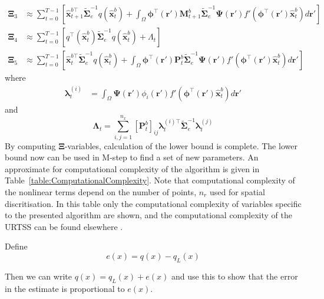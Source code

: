 \documentclass[]{article}
\begin{document}
\begin{align}
\boldsymbol\Xi_{3}&\approx\sum_{t=0}^{T-1}\left[ \mathbf{\hat x}_{t+1}^{b\top}\tilde{\boldsymbol\Sigma}_e^{-1}q(\mathbf{\hat x}_t^b)+\int_\Omega\boldsymbol \phi^\top(\mathbf r') \mathbf M_{t+1}^b \tilde{\boldsymbol\Sigma}_e^{-1} \boldsymbol{\Psi}(\mathbf{r}') f'(\boldsymbol \phi^\top(\mathbf r')\mathbf {\hat x}_t^b) d\mathbf{r}'\right] \\	
\boldsymbol\Xi_{4}&\approx\sum_{t=0}^{T-1}\left[q^\top(\mathbf{\hat x}_t^b)\tilde{\boldsymbol\Sigma}_e^{-1}q(\mathbf{\hat x}_t^b)+\Lambda_t\right] \\
 \boldsymbol\Xi_{5}&\approx\sum_{t=0}^{T-1}\left[ \mathbf{\hat x}_{t}^{b\top}\tilde{\boldsymbol\Sigma}_e^{-1}q(\mathbf{\hat x}_t^b)+\int_\Omega\boldsymbol \phi^\top(\mathbf r') \mathbf P_t^b \tilde{\boldsymbol\Sigma}_e^{-1}  \boldsymbol{\Psi}(\mathbf{r}') f'(\boldsymbol \phi^\top(\mathbf r')\mathbf {\hat x}_t^b) d\mathbf{r}'\right] 
 \end{align}
where
\begin{align}\label{eq:lambdat} 
	{\boldsymbol \lambda}_t^{(i)}&=\int_{\Omega} \boldsymbol \Psi(\mathbf r')\phi_i(\mathbf r')f'(\boldsymbol\phi^\top(\mathbf r')\mathbf {\hat x}_t^b)d\mathbf r'
\end{align}
and
\begin{equation}
 \boldsymbol\Lambda_t=\sum_{i,j=1}^{n_x}[\mathbf{P}_t^b]_{ij}{\boldsymbol\lambda}_t^{(i)\top}\tilde{\boldsymbol\Sigma}_e^{-1}{\boldsymbol\lambda}_t^{(j)}
\end{equation}
By computing $\boldsymbol\Xi$-variables, calculation of the lower bound is complete. The lower bound now can be used in M-step to find a set of new parameters. An approximate for computational complexity of the algorithm is given in Table~\ref{table:ComputationalComplexity}. Note that computational complexity of the nonlinear terms depend on the number of points, $n_r$ used for spatial discritisation.  In this table only the computational complexity of variables specific to the presented algorithm are shown, and the computational complexity of the URTSS can be found elsewhere \cite{Sarkka2010}.




Define
\begin{equation}
	e(x) = q(x) - q_L(x) \nonumber
\end{equation}

Then we can write $q(x) = q_L(x) + e(x)$ and use this to show that the error in the estimate is proportional to $e(x)$.
\end{document}
